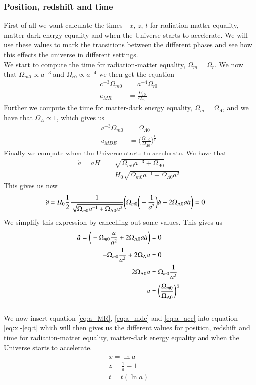 \documentclass{aa}
\begin{document}
\subsubsection{Position, redshift and time }
First of all we want calculate the times - $x$, $z$, $t$ for radiation-matter equality, matter-dark energy equality and when the Universe starts to accelerate. We will use these values to mark the transitions between the different phases and see how this effects the universe in different settings.\\
We start to compute the time for radiation-matter equality, $\Omega_{m}=\Omega_{r}$. We now that $\Omega_{m0}\propto a^{-3}$ and $\Omega_{r0}\propto a^{-4}$ we then get the equation
\begin{align}
    a^{-3}\Omega_{m0}&=a^{-4}\Omega_{r0}\\
    a_{MR}&=\frac{\Omega_{r0}}{\Omega_{m0}} \label{eq:a_MR}
\end{align}
Further we compute the time for matter-dark energy equality, $\Omega_{m}=\Omega_{\Lambda}$, and we have that $\Omega_{\Lambda}\propto 1$, which gives us
\begin{align}
    a^{-3}\Omega_{m0}&=\Omega_{\Lambda0}\\
    a_{MDE}&=\bigg(\frac{\Omega_{m0}}{\Omega_{\Lambda0}}\bigg)^{\frac{1}{3}} \label{eq:a_mde}
\end{align}
Finally we compute when the Universe starts to accelerate. We have that 
\begin{align}
    \Dot{a}=aH&=\sqrt{\Omega_{m0}a^{-3}+\Omega_{\Lambda0}}\\
    &=H_0\sqrt{\Omega_{m0}a^{-1}+\Omega_{\Lambda0} a^2}
\end{align}
This gives us now 
\begin{align}
    \Ddot{a}&=H_0\frac{1}{2}\frac{1}{\sqrt{\Omega_{m0}a^{-1}+\Omega_{\Lambda0} a^2}}\bigg(\Omega_{m0}\bigg(-\frac{1}{a^2}\bigg)\Dot{a}+2\Omega_{\Lambda0} a\Dot{a}\bigg)=0
\end{align}
We simplify this expression by cancelling out some values. This gives us
\begin{align}
    \Ddot{a}=\bigg(-\Omega_{m0}\frac{\Dot{a}}{a^2}+2\Omega_{\Lambda0} a\Dot{a}\bigg)&=0\\
    -\Omega_{m0}\frac{1}{a^2}+2\Omega_\Lambda a&=0\\
    2\Omega_{\Lambda0} a&=\Omega_{m0}\frac{1}{a^2}\\
    a&=\bigg(\frac{\Omega_{m0}}{\Omega_{\Lambda0}}\bigg)^\frac{1}{3} \label{eq:a_acc}
\end{align}
\\
We now insert equation \eqref{eq:a_MR}, \eqref{eq:a_mde} and \eqref{eq:a_acc} into equation \eqref{eq:x}-\eqref{eq:t} which will then gives us the different values for position, redshift and time for radiation-matter equality, matter-dark energy equality and when the Universe starts to accelerate.
\begin{align}
    x=\ln{a} \label{eq:x}\\
    z = \frac{1}{a}-1 \label{eq:z}\\
    t=t(\ln{a}) \label{eq:t}
\end{align}
\end{document}
